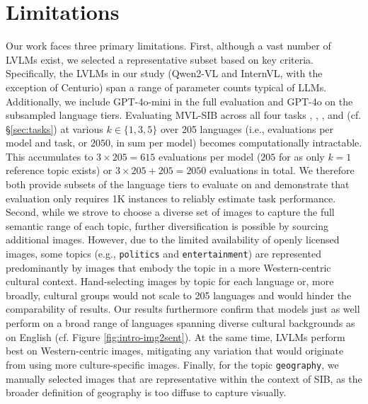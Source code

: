 \section{Limitations}
\label{sec:limitations}
%

Our work faces three primary limitations. First, although a vast number of LVLMs exist, we selected a representative subset based on key criteria. Specifically, the LVLMs in our study (Qwen2-VL and InternVL, with the exception of Centurio) span a range of parameter counts typical of LLMs. Additionally, we include GPT-4o-mini in the full evaluation and GPT-4o on the subsampled language tiers. Evaluating MVL-SIB across all four tasks \its, \sti, \tts, and \stt (cf. \S\ref{sec:tasks}) at various $k \in \{1,3,5\}$   over 205 languages (i.e., evaluations per model and task, or $2050$, in sum per model) becomes computationally intractable.  This accumulates to $3 \times 205 = 615$ evaluations per model ($205$ for \tts as only $k{=}1$ reference topic exists) or $3 \times 205 + 205 = 2050$ evaluations in total. We therefore both provide subsets of the language tiers to evaluate on and demonstrate that evaluation only requires 1K instances to reliably estimate task performance.
Second, while we strove to choose a diverse set of images to capture the full semantic range of each topic, further diversification is possible by sourcing additional images. However, due to the limited availability of openly licensed images, some topics (e.g., \texttt{politics} and \texttt{entertainment}) are represented predominantly by images that embody the topic in a more Western-centric cultural context. Hand-selecting images by topic for each language or, more broadly, cultural groups would not scale to 205 languages and would hinder the comparability of results. Our results furthermore confirm that models just as well perform on a broad range of languages spanning diverse cultural backgrounds as on English (cf. Figure \ref{fig:intro-img2sent}). At the same time, LVLMs perform best on Western-centric images, mitigating any variation that would originate from using more culture-specific images.
Finally, for the topic \texttt{geography}, we manually selected images that are representative within the context of SIB, as the broader definition of geography is too diffuse to capture visually.